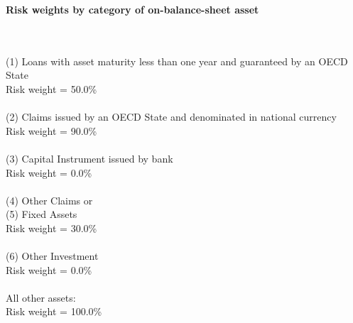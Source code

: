 \documentclass{article}
\begin{document}
\setlength{\parindent}{0em}
\begin{center}{\bf Risk weights by category of on-balance-sheet asset}\end{center}
~\\
~\\

(1) Loans with asset maturity less than one year and guaranteed by an OECD State \\
Risk weight = 50.0\%\\

~\\
(2) Claims issued by an OECD State and denominated in national currency \\
Risk weight = 90.0\%\\

~\\
(3) Capital Instrument issued by bank \\
Risk weight = 0.0\%\\

~\\
(4) Other Claims or \\
(5) Fixed Assets \\
Risk weight = 30.0\%\\

~\\
(6) Other Investment\\
Risk weight = 0.0\%\\

~\\
All other assets:\\
Risk weight = 100.0\%\\

~\\
\end{document}
